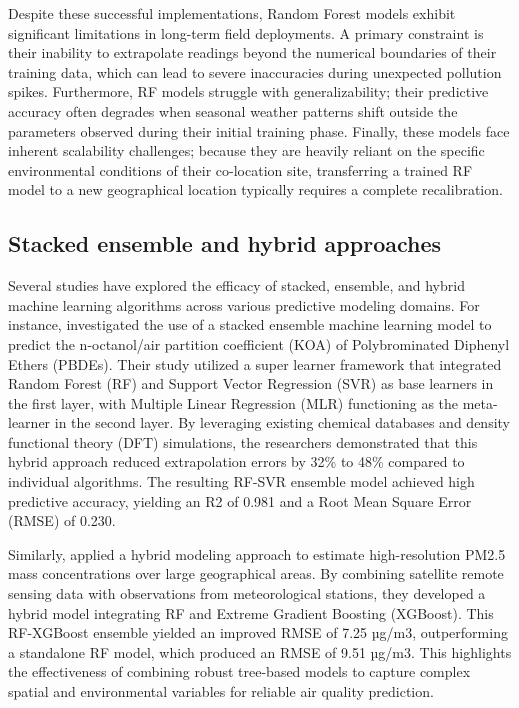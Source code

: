 Despite these successful implementations, Random Forest models exhibit significant limitations in long-term field deployments. A primary constraint is their inability to extrapolate readings beyond the numerical boundaries of their training data, which can lead to severe inaccuracies during unexpected pollution spikes. Furthermore, RF models struggle with generalizability; their predictive accuracy often degrades when seasonal weather patterns shift outside the parameters observed during their initial training phase. Finally, these models face inherent scalability challenges; because they are heavily reliant on the specific environmental conditions of their co-location site, transferring a trained RF model to a new geographical location typically requires a complete recalibration. 

\subsection{Stacked ensemble and hybrid approaches}
Several studies have explored the efficacy of stacked, ensemble, and hybrid machine learning algorithms across various predictive modeling domains. For instance, \cite{Wu_2026} investigated the use of a stacked ensemble machine learning model to predict the n-octanol/air partition coefficient (KOA) of Polybrominated Diphenyl Ethers (PBDEs). Their study utilized a super learner framework that integrated Random Forest (RF) and Support Vector Regression (SVR) as base learners in the first layer, with Multiple Linear Regression (MLR) functioning as the meta-learner in the second layer. By leveraging existing chemical databases and density functional theory (DFT) simulations, the researchers demonstrated that this hybrid approach reduced extrapolation errors by 32\% to 48\% compared to individual algorithms. The resulting RF-SVR ensemble model achieved high predictive accuracy, yielding an R2 of 0.981 and a Root Mean Square Error (RMSE) of 0.230. 

Similarly, \cite{Tang_2025} applied a hybrid modeling approach to estimate high-resolution PM2.5 mass concentrations over large geographical areas. By combining satellite remote sensing data with observations from meteorological stations, they developed a hybrid model integrating RF and Extreme Gradient Boosting (XGBoost). This RF-XGBoost ensemble yielded an improved RMSE of 7.25 µg/m3, outperforming a standalone RF model, which produced an RMSE of 9.51 µg/m3. This highlights the effectiveness of combining robust tree-based models to capture complex spatial and environmental variables for reliable air quality prediction. 

